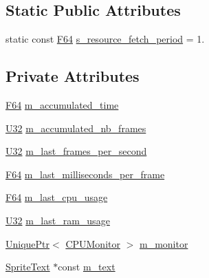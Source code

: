 \subsection*{Static Public Attributes}
\begin{DoxyCompactItemize}
\item 
static const \hyperlink{namespacemage_ad26233bbec640deda836e572c1a23708}{F64} \hyperlink{classmage_1_1_stats_script_acf98f29dd44164fb7d5859a8d5b297fa}{s\+\_\+resource\+\_\+fetch\+\_\+period} = 1.
\end{DoxyCompactItemize}
\subsection*{Private Attributes}
\begin{DoxyCompactItemize}
\item 
\hyperlink{namespacemage_ad26233bbec640deda836e572c1a23708}{F64} \hyperlink{classmage_1_1_stats_script_a4b7d6ce800fbec0851f4e89f9291c351}{m\+\_\+accumulated\+\_\+time}
\item 
\hyperlink{namespacemage_a41c104c036fba3756a74e19f793eeaa1}{U32} \hyperlink{classmage_1_1_stats_script_a0a5a7a81f47e6929c3a49355e494df2e}{m\+\_\+accumulated\+\_\+nb\+\_\+frames}
\item 
\hyperlink{namespacemage_a41c104c036fba3756a74e19f793eeaa1}{U32} \hyperlink{classmage_1_1_stats_script_a93abeec5884239fe27961d5cb5871231}{m\+\_\+last\+\_\+frames\+\_\+per\+\_\+second}
\item 
\hyperlink{namespacemage_ad26233bbec640deda836e572c1a23708}{F64} \hyperlink{classmage_1_1_stats_script_a60f952a8e8d920239a7b76ac384e0819}{m\+\_\+last\+\_\+milliseconds\+\_\+per\+\_\+frame}
\item 
\hyperlink{namespacemage_ad26233bbec640deda836e572c1a23708}{F64} \hyperlink{classmage_1_1_stats_script_a18ef542485b22d2f1834832cd498e7df}{m\+\_\+last\+\_\+cpu\+\_\+usage}
\item 
\hyperlink{namespacemage_a41c104c036fba3756a74e19f793eeaa1}{U32} \hyperlink{classmage_1_1_stats_script_ad7eacb6dd3ae5b6c41ed6ba5d9264d3b}{m\+\_\+last\+\_\+ram\+\_\+usage}
\item 
\hyperlink{namespacemage_a3316d7143a973e37adf1110f2e80ca31}{Unique\+Ptr}$<$ \hyperlink{classmage_1_1_c_p_u_monitor}{C\+P\+U\+Monitor} $>$ \hyperlink{classmage_1_1_stats_script_a12e321d8fe1003de3643c4b799dd4c8f}{m\+\_\+monitor}
\item 
\hyperlink{classmage_1_1_sprite_text}{Sprite\+Text} $\ast$const \hyperlink{classmage_1_1_stats_script_a15f95a755a20b01a80df24a8c073b6c5}{m\+\_\+text}
\end{DoxyCompactItemize}
